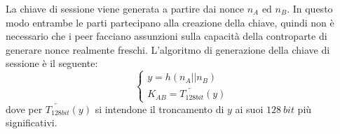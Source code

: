 	La chiave di sessione viene generata a partire dai nonce $n_A$ ed $n_B$. In questo modo entrambe le parti partecipano
	alla creazione della chiave, quindi non è necessario che i peer facciano assunzioni sulla capacità
	della controparte di generare nonce realmente freschi.
	L'algoritmo di generazione della chiave di sessione è il seguente:
	\[
		\begin{cases}
			y = h ( n_A || n_B )\\
			K_{AB} =  \overleftarrow{T_{128bit}}(y)
		\end{cases}
	\]
	dove per $\overleftarrow{T_{128bit}}(y)$ si intendone il troncamento di $y$ ai suoi $128\ bit$ più significativi.
\clearpage{\pagestyle{empty}\cleardoublepage}
